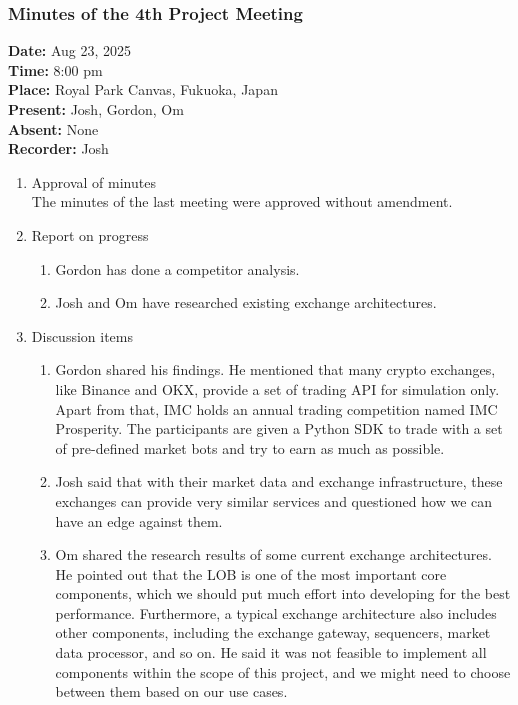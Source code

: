 \documentclass[12pt,a4paper]{article}
\begin{document}
\subsubsection{Minutes of the 4th Project Meeting}
\textbf{Date:} Aug 23, 2025\\
\textbf{Time:} 8:00 pm\\
\textbf{Place:} Royal Park Canvas, Fukuoka, Japan\\
\textbf{Present:} Josh, Gordon, Om\\
\textbf{Absent:} None\\
\textbf{Recorder:} Josh

\begin{enumerate}
\item Approval of minutes\\
The minutes of the last meeting were approved without amendment.\\
\item Report on progress
\begin{enumerate}
\item Gordon has done a competitor analysis.\\
\item Josh and Om have researched existing exchange architectures.\\
\end{enumerate}
\item Discussion items
\begin{enumerate}
\item Gordon shared his findings. He mentioned that many crypto exchanges, like Binance and OKX, provide a set of trading API for simulation only. Apart from that, IMC holds an annual trading competition named IMC Prosperity. The participants are given a Python SDK to trade with a set of pre-defined market bots and try to earn as much as possible.\\
\item Josh said that with their market data and exchange infrastructure, these exchanges can provide very similar services and questioned how we can have an edge against them.\\
\item Om shared the research results of some current exchange architectures. He pointed out that the LOB is one of the most important core components, which we should put much effort into developing for the best performance. Furthermore, a typical exchange architecture also includes other components, including the exchange gateway, sequencers, market data processor, and so on. He said it was not feasible to implement all components within the scope of this project, and we might need to choose between them based on our use cases.\\

\end{enumerate}
\end{enumerate}
\end{document}
